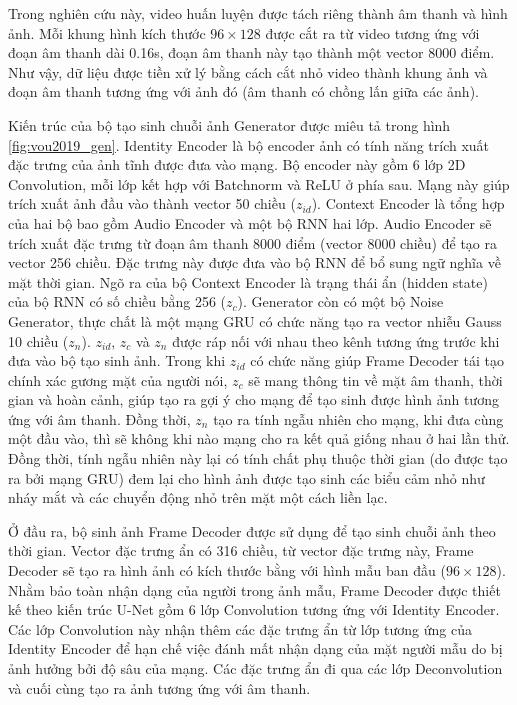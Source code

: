 Trong nghiên cứu này, video huấn luyện được tách riêng thành âm thanh và hình ảnh. Mỗi khung hình kích thước $96\times128$ được cắt ra từ video tương ứng với đoạn âm thanh dài 0.16s, đoạn âm thanh này tạo thành một vector 8000 điểm. Như vậy, dữ liệu được tiền xử lý bằng cách cắt nhỏ video thành khung ảnh và đoạn âm thanh tương ứng với ảnh đó (âm thanh có chồng lấn giữa các ảnh).

Kiến trúc của bộ tạo sinh chuỗi ảnh Generator được miêu tả trong hình \ref{fig:vou2019_gen}. Identity Encoder là bộ encoder ảnh có tính năng trích xuất đặc trưng của ảnh tĩnh được đưa vào mạng. Bộ encoder này gồm 6 lớp 2D Convolution, mỗi lớp kết hợp với Batchnorm và ReLU ở phía sau. Mạng này giúp trích xuất ảnh đầu vào thành vector 50 chiều ($z_{id}$). Context Encoder là tổng hợp của hai bộ bao gồm Audio Encoder và một bộ RNN hai lớp. Audio Encoder sẽ trích xuất đặc trưng từ đoạn âm thanh 8000 điểm (vector 8000 chiều) để tạo ra vector 256 chiều. Đặc trưng này được đưa vào bộ RNN để bổ sung ngữ nghĩa về mặt thời gian. Ngõ ra của bộ Context Encoder là trạng thái ẩn (hidden state) của bộ RNN có số chiều bằng 256 ($z_c$). Generator còn có một bộ Noise Generator, thực chất là một mạng GRU có chức năng tạo ra vector nhiễu Gauss 10 chiều ($z_n$). $z_{id}$, $z_c$ và $z_n$ được ráp nối với nhau theo kênh tương ứng trước khi đưa vào bộ tạo sinh ảnh. Trong khi $z_{id}$ có chức năng giúp Frame Decoder tái tạo chính xác gương mặt của người nói, $z_c$ sẽ mang thông tin về mặt âm thanh, thời gian và hoàn cảnh, giúp tạo ra gợi ý cho mạng để tạo sinh được hình ảnh tương ứng với âm thanh. Đồng thời, $z_n$ tạo ra tính ngẫu nhiên cho mạng, khi đưa cùng một đầu vào, thì sẽ không khi nào mạng cho ra kết quả giống nhau ở hai lần thử. Đồng thời, tính ngẫu nhiên này lại có tính chất phụ thuộc thời gian (do được tạo ra bởi mạng GRU) đem lại cho hình ảnh được tạo sinh các biểu cảm nhỏ như nháy mắt và các chuyển động nhỏ trên mặt một cách liền lạc.

Ở đầu ra, bộ sinh ảnh Frame Decoder được sử dụng để tạo sinh chuỗi ảnh theo thời gian. Vector đặc trưng ẩn có 316 chiều, từ vector đặc trưng này, Frame Decoder sẽ tạo ra hình ảnh có kích thước bằng với hình mẫu ban đầu ($96\times128$). Nhằm bảo toàn nhận dạng của người trong ảnh mẫu, Frame Decoder được thiết kế theo kiến trúc U-Net gồm 6 lớp Convolution tương ứng với Identity Encoder. Các lớp Convolution này nhận thêm các đặc trưng ẩn từ lớp tương ứng của Identity Encoder để hạn chế việc đánh mất nhận dạng của mặt người mẫu do bị ảnh hưởng bởi độ sâu của mạng. Các đặc trưng ẩn đi qua các lớp Deconvolution và cuối cùng tạo ra ảnh tương ứng với âm thanh.


